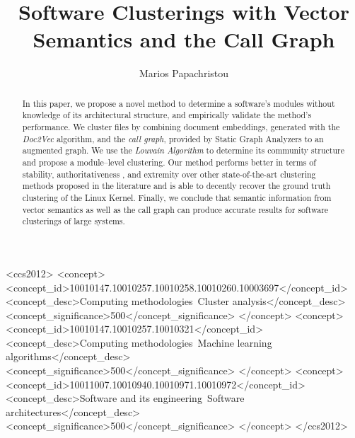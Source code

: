 \documentclass[sigconf, screen]{acmart}
\begin{document}
%
\title{Software Clusterings with Vector Semantics and 
the Call Graph}

%
\author{Marios Papachristou}


\renewcommand{\shortauthors}{Papachristou}

\begin{abstract}

In this paper, we propose a novel method to determine a software's modules without knowledge of its architectural structure, and empirically validate the method's performance. We cluster files by combining document embeddings, generated with the  \emph{Doc2Vec} algorithm, and the \emph{call graph}, provided by Static Graph Analyzers to an augmented graph. We use the \emph{Louvain Algorithm} to determine its community structure and propose a module--level clustering. 
Our method performs better in terms of stability, authoritativeness 
, and extremity over other state-of-the-art clustering methods proposed in the literature and is able to decently 
recover the ground truth clustering of the Linux Kernel. 
Finally, we conclude that semantic information from vector semantics as well as the call graph can produce 
accurate results for software clusterings of large systems.

\end{abstract}

%
%
\begin{CCSXML}
<ccs2012>
<concept>
<concept_id>10010147.10010257.10010258.10010260.10003697</concept_id>
<concept_desc>Computing methodologies~Cluster analysis</concept_desc>
<concept_significance>500</concept_significance>
</concept>
<concept>
<concept_id>10010147.10010257.10010321</concept_id>
<concept_desc>Computing methodologies~Machine learning algorithms</concept_desc>
<concept_significance>500</concept_significance>
</concept>
<concept>
<concept_id>10011007.10010940.10010971.10010972</concept_id>
<concept_desc>Software and its engineering~Software architectures</concept_desc>
<concept_significance>500</concept_significance>
</concept>
</ccs2012>
\end{CCSXML}
\end{document}
